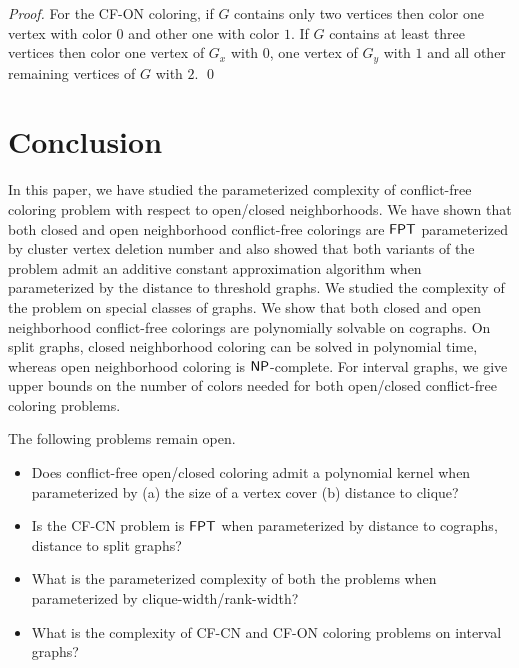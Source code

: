 \documentclass[svgnames]{llncs}
\newcommand{\NP}{\ensuremath{\sf{NP}}\xspace}
\newcommand{\fpt}{\ensuremath{\sf{FPT}}\xspace}
\newcommand{\cfcn}{\textsc {CF-CN}}
\newcommand{\cfon}{\textsc {CF-ON}}
\begin{document}
\begin{proof}
For the \cfon{} coloring, if $G$ contains only two vertices then color one vertex with color $0$ and other one with color $1$. If $G$ contains at least three vertices then color one vertex of $G_x$ with $0$, one vertex of $G_y$ with $1$ and all other remaining vertices of $G$ with $2$. \qed
\end{proof}

\section{Conclusion}
In this paper, we have studied the parameterized complexity of conflict-free coloring problem with respect to open/closed neighborhoods.
We have shown that both closed and open neighborhood conflict-free colorings are $\fpt$ parameterized by cluster vertex deletion number and also showed that both variants of the problem admit an additive constant approximation algorithm when parameterized by the distance to threshold graphs. We studied the complexity of the problem on special classes of graphs. We show that both closed and open neighborhood conflict-free colorings are polynomially solvable on cographs. On split graphs, closed neighborhood coloring can be solved in polynomial time, whereas open neighborhood coloring is $\NP$-complete. For interval graphs, we give upper bounds on the number of colors needed for both open/closed conflict-free coloring problems. 

The following problems remain open. 
\begin{itemize}
 \item Does conflict-free open/closed coloring admit a polynomial kernel when parameterized by (a) the size of a vertex cover (b) distance to clique?
 \item Is the \cfcn{} problem is \fpt{} when parameterized by distance to cographs, distance to split graphs?
 \item What is the parameterized complexity of both the problems when parameterized by clique-width/rank-width?
 \item  What is the complexity of \cfcn{} and \cfon{} coloring problems on interval graphs?
\end{itemize}

\end{document}
